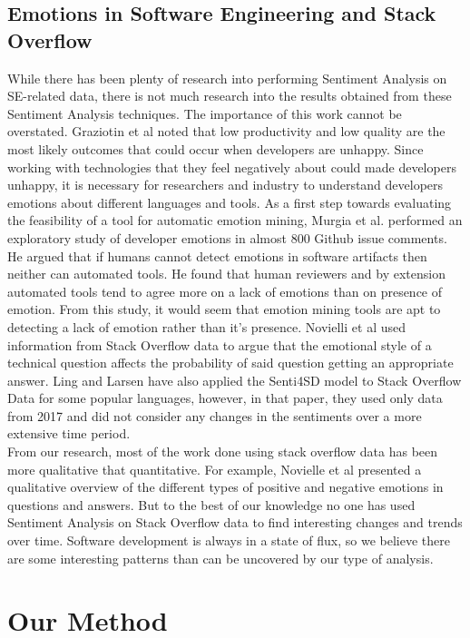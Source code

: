 \documentclass[conference]{IEEEtran}
\begin{document}
\subsection{Emotions in Software Engineering and Stack Overflow}
While there has been plenty of research into performing Sentiment Analysis on SE-related data, there is not much research into the results obtained from these Sentiment Analysis techniques. The importance of this work cannot be overstated. Graziotin et al \cite{b38} noted that low productivity and low quality are the most likely outcomes that could occur when developers are unhappy. Since working with technologies that they feel negatively about could made developers unhappy, it is necessary for researchers and industry to understand developers emotions about different languages and tools. As a first step towards evaluating the feasibility of a tool for automatic emotion mining, Murgia et al. \cite{39} performed an exploratory study
of developer emotions in almost 800 Github issue comments. He argued that if humans cannot detect emotions in software artifacts then neither can automated tools. He found that human reviewers and by extension automated tools tend to agree more on a lack of emotions than on presence of emotion. From this study, it would seem that emotion mining tools are apt to detecting a lack of emotion rather than it's presence. Novielli et al\cite{b33} used information from Stack Overflow data to argue that the emotional style of a technical question affects the probability of said question getting an appropriate answer.  Ling and Larsen\cite{b11} have also applied the Senti4SD model to Stack Overflow Data for some popular languages, however, in that paper, they used only data from 2017 and did not consider any changes in the sentiments over a more extensive time period. \\

From our research, most of the work done using stack overflow data has been more qualitative that quantitative. For example, Novielle et al \cite{b34} presented a qualitative overview of the different types of positive and negative emotions in questions and answers. But to the best of our knowledge no one has used Sentiment Analysis on Stack Overflow data to find interesting changes and trends over time. Software development is always in a state of flux, so we believe there are some interesting patterns than can be uncovered by our type of analysis.\\

\section{Our Method}
 
\end{document}
